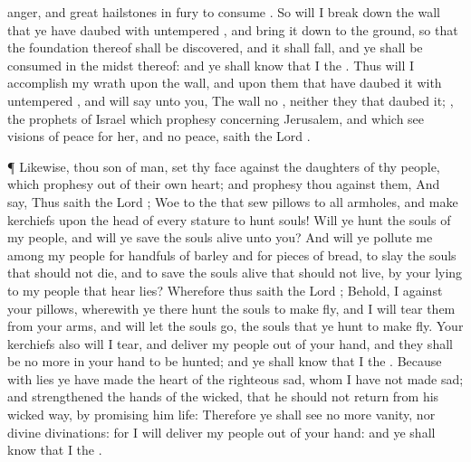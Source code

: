 {anger, and great
hailstones in
{}
fury to
consume
{}.
So will I break
down the
wall that ye have
daubed with
untempered
{}, and
bring it down to the
ground, so that the
foundation thereof shall be
discovered, and it shall
fall, and ye shall be
consumed in the
midst thereof: and ye shall
know that I
{} the
{}.
Thus will I
accomplish my
wrath upon the
wall, and upon them that have
daubed it with
untempered
{}, and will
say unto you, The
wall
{} no
{}, neither they that
daubed it;
, the
prophets of
Israel which
prophesy concerning
Jerusalem, and which
see
visions of
peace for her, and
{} no
peace,
saith the
Lord
{}.
\par }{\PP {}¶ Likewise, thou
son of
man,
set thy
face against the
daughters of thy
people, which
prophesy out of their own
heart; and
prophesy thou against them,
And
say, Thus
saith the
Lord
{};
Woe to the
{} that
sew
pillows to all
armholes, and
make
kerchiefs upon the
head of every
stature to
hunt
souls! Will ye
hunt the
souls of my
people, and will ye
save the
souls
alive
{} unto you?
And will ye
pollute me among my
people for
handfuls of
barley and for
pieces of
bread, to
slay the
souls that should not
die, and to
save the
souls
alive that should not
live, by your
lying to my
people that
hear
{}
lies?
Wherefore thus
saith the
Lord
{}; Behold, I
{} against your
pillows, wherewith
ye there
hunt the
souls to make
{}
fly, and I will
tear them from your
arms, and will let the
souls
go,
{} the
souls that ye
hunt to make
{}
fly.
Your
kerchiefs also will I
tear, and
deliver my
people out of your
hand, and they shall be no more in your
hand to be
hunted; and ye shall
know that I
{} the
{}.
Because with
lies ye have made the
heart of the
righteous
sad, whom I have not made
sad; and
strengthened the
hands of the
wicked, that he should not
return from his
wicked
way, by promising him
life:
Therefore ye shall
see no more
vanity, nor
divine
divinations: for I will
deliver my
people out of your
hand: and ye shall
know that I
{} the
{}.

}
